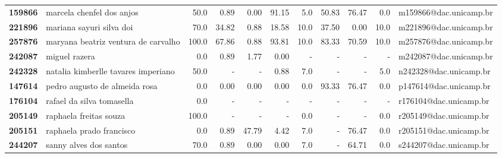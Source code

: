 \documentclass[11pt]{article}
\begin{document}
\begin{center}
\begin{landscape}
\begin{longtable}{llrrrrrrrrl}
\textbf{159866} &              marcela chenfel dos anjos &                  50.0 &        0.89 &        0.00 &       91.15 &                      5.0 &       50.83 &       76.47 &                        0.0 &  m159866@dac.unicamp.br \\
\textbf{221896} &               mariana sayuri silva doi &                  70.0 &       34.82 &        0.88 &       18.58 &                     10.0 &       37.50 &        0.00 &                       10.0 &  m221896@dac.unicamp.br \\
\textbf{257876} &    maryana beatriz ventura de carvalho &                 100.0 &       67.86 &        0.88 &       93.81 &                     10.0 &       83.33 &       70.59 &                       10.0 &  m257876@dac.unicamp.br \\
\textbf{242087} &                          miguel razera &                   0.0 &        0.89 &        1.77 &        0.00 &                        - &           - &           - &                          - &  m242087@dac.unicamp.br \\
\textbf{242328} &    natalia kimberlle tavares imperiano &                  50.0 &           - &           - &        0.88 &                      7.0 &           - &           - &                        5.0 &  n242328@dac.unicamp.br \\
\textbf{147614} &          pedro augusto de almeida rosa &                   0.0 &        0.00 &        0.00 &        0.00 &                      0.0 &       93.33 &       76.47 &                        0.0 &  p147614@dac.unicamp.br \\
\textbf{176104} &              rafael da silva tomasella &                   0.0 &           - &           - &           - &                        - &           - &           - &                          - &  r176104@dac.unicamp.br \\
\textbf{205149} &                 raphaela freitas souza &                 100.0 &           - &           - &           - &                      0.0 &           - &           - &                        0.0 &  r205149@dac.unicamp.br \\
\textbf{205151} &               raphaela prado francisco &                   0.0 &        0.89 &       47.79 &        4.42 &                      7.0 &           - &       76.47 &                        0.0 &  r205151@dac.unicamp.br \\
\textbf{244207} &                 sanny alves dos santos &                  70.0 &        0.89 &        0.00 &        0.00 &                      7.0 &           - &       64.71 &                        0.0 &  s244207@dac.unicamp.br \\

\end{longtable}
\end{landscape}
\end{center}
\end{document}
